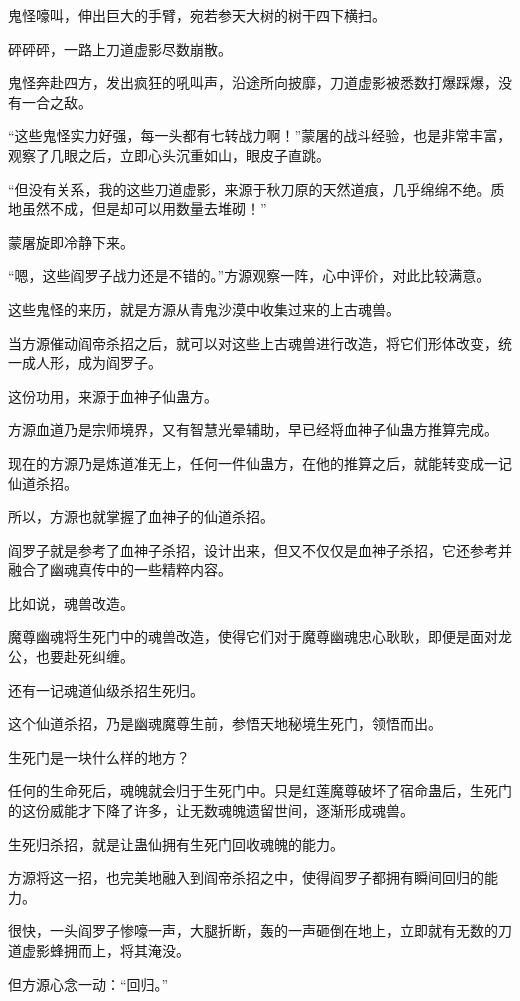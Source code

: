 \begin{this_body}
鬼怪嚎叫，伸出巨大的手臂，宛若参天大树的树干四下横扫。

砰砰砰，一路上刀道虚影尽数崩散。

鬼怪奔赴四方，发出疯狂的吼叫声，沿途所向披靡，刀道虚影被悉数打爆踩爆，没有一合之敌。

“这些鬼怪实力好强，每一头都有七转战力啊！”蒙屠的战斗经验，也是非常丰富，观察了几眼之后，立即心头沉重如山，眼皮子直跳。

“但没有关系，我的这些刀道虚影，来源于秋刀原的天然道痕，几乎绵绵不绝。质地虽然不成，但是却可以用数量去堆砌！”

蒙屠旋即冷静下来。

“嗯，这些阎罗子战力还是不错的。”方源观察一阵，心中评价，对此比较满意。

这些鬼怪的来历，就是方源从青鬼沙漠中收集过来的上古魂兽。

当方源催动阎帝杀招之后，就可以对这些上古魂兽进行改造，将它们形体改变，统一成人形，成为阎罗子。

这份功用，来源于血神子仙蛊方。

方源血道乃是宗师境界，又有智慧光晕辅助，早已经将血神子仙蛊方推算完成。

现在的方源乃是炼道准无上，任何一件仙蛊方，在他的推算之后，就能转变成一记仙道杀招。

所以，方源也就掌握了血神子的仙道杀招。

阎罗子就是参考了血神子杀招，设计出来，但又不仅仅是血神子杀招，它还参考并融合了幽魂真传中的一些精粹内容。

比如说，魂兽改造。

魔尊幽魂将生死门中的魂兽改造，使得它们对于魔尊幽魂忠心耿耿，即便是面对龙公，也要赴死纠缠。

还有一记魂道仙级杀招生死归。

这个仙道杀招，乃是幽魂魔尊生前，参悟天地秘境生死门，领悟而出。

生死门是一块什么样的地方？

任何的生命死后，魂魄就会归于生死门中。只是红莲魔尊破坏了宿命蛊后，生死门的这份威能才下降了许多，让无数魂魄遗留世间，逐渐形成魂兽。

生死归杀招，就是让蛊仙拥有生死门回收魂魄的能力。

方源将这一招，也完美地融入到阎帝杀招之中，使得阎罗子都拥有瞬间回归的能力。

很快，一头阎罗子惨嚎一声，大腿折断，轰的一声砸倒在地上，立即就有无数的刀道虚影蜂拥而上，将其淹没。

但方源心念一动：“回归。”


\end{this_body}
